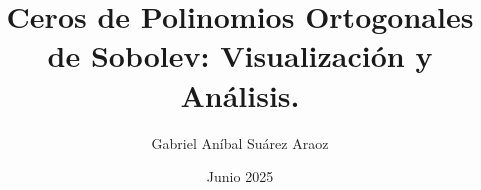 
\newcommand{\Estudios}{Grado}

\newcommand{\TituloEstudios}{Matemáticas e Informática}

\newcommand{\Departamento}{Departamento de Matemática Aplicada a las Tecnologías de la Información y las Comunicaciones}

\newcommand{\NombreAutor}{Gabriel Aníbal Suárez Araoz}

\newcommand{\NombreTutor}{María Del Carmen Escribano Iglesias y Raquel Natividad Gonzalo Palomar}

\newcommand{\TituloTFG}{Ceros de Polinomios Ortogonales de Sobolev: Visualización y Análisis.}

\newcommand{\Fecha}{Junio 2025}

\title{\TituloTFG}
\author{\NombreAutor}
\date{\Fecha}

